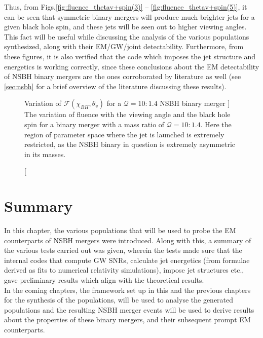     Thus, from Figs.\ref{fig:fluence_thetav+spin(3)} --
    \ref{fig:fluence_thetav+spin(5)}, it can be seen that symmetric binary mergers will
    produce much brighter jets for a given black hole spin, and these jets will be seen
    out to higher viewing angles. This fact will be useful while discussing the analysis
    of the various populations synthesized, along with their EM/GW/joint
    detectability.  Furthermore, from these figures, it is also verified that the code
    which imposes the jet structure and energetics is working correctly, since these
    conclusions about the EM detectability of NSBH binary mergers are the ones
    corroborated by literature as well (see \ref{sec:nsbh} for a brief overview of the
    literature discussing these results).

    \begin{figure}[ht]
        \centering
        \def\svgwidth{0.8\linewidth}
        
        \caption
        [
            Variation of $\mathcal{F}(\chi_{BH}, \theta_{v})$ for a $\mathcal{Q}=10:1.4$
            NSBH binary merger
        ]
        {
            The variation of fluence with the viewing angle and the black hole spin for
            a binary merger with a mass ratio of $\mathcal{Q}=10:1.4$. Here the region
            of parameter space where the jet is launched is extremely restricted, as the
            NSBH binary in question is extremely asymmetric in its masses.
        }
        \label{fig:fluence_thetav+spin(10)}
    \end{figure}

\section{Summary}

    In this chapter, the various populations that will be used to probe the EM
    counterparts of NSBH mergers were introduced. Along with this, a summary of the
    various tests carried out was given, wherein the tests made sure that the internal
    codes that compute GW SNRs, calculate jet energetics (from formulae derived as fits
    to numerical relativity simulations), impose jet structures etc., gave preliminary
    results which align with the theoretical results.\\
    In the coming chapters, the framework set up in this and the previous chapters for
    the synthesis of the populations, will be used to analyse the generated populations
    and the resulting NSBH merger events will be used to derive results about the
    properties of these binary mergers, and their subsequent prompt EM counterparts.
